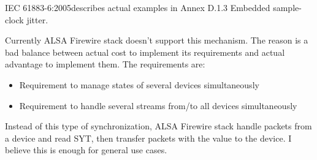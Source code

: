 \documentclass[onecolumn]{jarticle}
\begin{document}
IEC 61883-6:2005\cite{iec61883-6-2}describes actual examples in Annex D.1.3 Embedded sample-clock jitter.

Currently ALSA Firewire stack doesn't support this mechanism. The reason is a bad balance between actual cost to implement its requirements and actual advantage to implement them. The requirements are:
\begin{itemize}
\item Requirement to manage states of several devices simultaneously
\item Requirement to handle several streams from/to all devices simultaneously
\end{itemize}

Instead of this type of synchronization, ALSA Firewire stack handle packets from a device and read SYT, then transfer packets with the value to the device. I believe this is enough for general use cases.

\newpage
\end{document}
